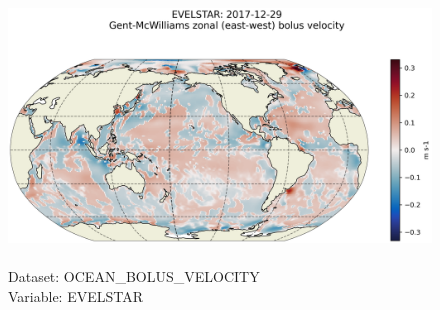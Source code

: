 \begin{figure}[H]
\centering
\includegraphics[scale=0.5]{../images/plots/latlon_plots/Gent-McWilliams_Ocean_Bolus_Velocity/EVELSTAR.png}
\caption{\\Dataset: OCEAN\_BOLUS\_VELOCITY\\Variable: EVELSTAR}
\label{tab:table-OCEAN_BOLUS_VELOCITY_EVELSTAR-Plot}
\end{figure}
\pagebreak
